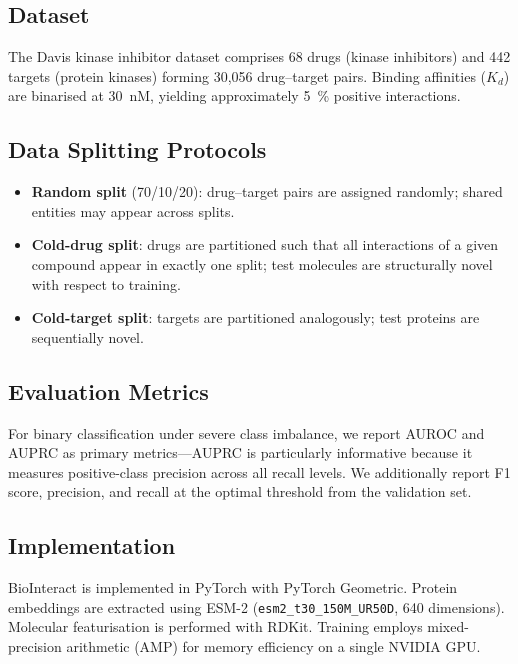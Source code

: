 \documentclass[fleqn,10pt]{wlscirep}
\begin{document}
\subsection{Dataset}

The Davis kinase inhibitor
dataset\cite{davis2011comprehensive} comprises 68 drugs (kinase inhibitors)
and 442 targets (protein kinases) forming 30{,}056 drug--target pairs.  Binding
affinities ($K_d$) are binarised at \SI{30}{nM}, yielding approximately
\SI{5}{\percent} positive interactions.

\subsection{Data Splitting Protocols}

\begin{itemize}[leftmargin=*]
\item \textbf{Random split} (70/10/20): drug--target pairs are assigned randomly;
  shared entities may appear across splits.
\item \textbf{Cold-drug split}: drugs are partitioned such that all interactions
  of a given compound appear in exactly one split; test molecules are
  structurally novel with respect to training.
\item \textbf{Cold-target split}: targets are partitioned analogously; test
  proteins are sequentially novel.
\end{itemize}

\subsection{Evaluation Metrics}

For binary classification under severe class imbalance, we report AUROC and
AUPRC as primary metrics---AUPRC is particularly informative because it measures
positive-class precision across all recall levels.  We additionally report F1
score, precision, and recall at the optimal threshold from the validation set.

\subsection{Implementation}

BioInteract is implemented in PyTorch with PyTorch
Geometric.\cite{fey2019fast}  Protein embeddings are extracted using
ESM-2\cite{lin2023evolutionary} (\texttt{esm2\_t30\_150M\_UR50D}, 640
dimensions).  Molecular featurisation is performed with
RDKit.\cite{rdkit}  Training employs mixed-precision arithmetic (AMP) for
memory efficiency on a single NVIDIA GPU.
\end{document}
